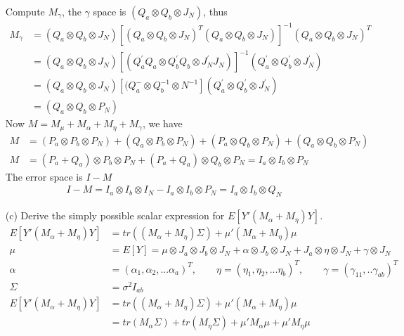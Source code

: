 \begin{itemize}
    Compute $M_\gamma$, the $\gamma$ space is $(Q_a \otimes Q_b \otimes J_N)$, thus
 \begin{align*}
    M_\gamma &= (Q_a \otimes Q_b \otimes J_N) [(Q_a \otimes Q_b \otimes J_N)^{T}(Q_a \otimes Q_b \otimes J_N)]^{-1} (Q_a \otimes Q_b \otimes J_N)^{T}\\
     &= (Q_a \otimes Q_b \otimes J_N) [(Q_a ^{'}Q_a\otimes Q_b^{'}Q_b \otimes J_N^{'}J_N)]^{-1}(Q_a^{'} \otimes Q_b^{'} \otimes J_N^{'})\\
     &= (Q_a \otimes Q_b \otimes J_N) [(Q_a^{-}\otimes Q_b^{-1} \otimes N^{-1}](Q_a^{'} \otimes Q_b^{'} \otimes J_N^{'})\\
     &= (Q_a \otimes Q_b \otimes P_N) 
 \end{align*}
    Now $M = M_{\mu} + M_{\alpha} + M_{\eta} + M_{\gamma}$, we have
 \begin{align*}
     M &=(P_a \otimes P_b \otimes P_N) + (Q_a \otimes P_b \otimes P_N) + (P_a \otimes Q_b \otimes P_N)  + (Q_a \otimes Q_b \otimes P_N) \\
     M &=(P_a + Q_a) \otimes P_b \otimes P_N + (P_a + Q_a) \otimes Q_b \otimes P_N  = I_a \otimes I_b \otimes P_N
 \end{align*}
    The error space is $I-M$
 \begin{align*}
     I-M = I_a \otimes I_b \otimes I_N - I_a \otimes I_b \otimes P_N = I_a \otimes I_b \otimes Q_N
 \end{align*}
 
    \item[(c)] Derive the simply possible scalar expression for $E[Y'(M_\alpha + M_\eta)Y]$.\\
 \begin{align*}
     E[Y'(M_\alpha + M_\eta)Y] &= tr((M_\alpha + M_\eta)\Sigma) + \mu'(M_\alpha + M_\eta)\mu \\
     \mu &= E[Y] = \mu \otimes J_a \otimes J_b \otimes J_N + \alpha \otimes J_b \otimes J_N + J_a \otimes \eta \otimes J_N + \gamma \otimes J_N \\
    \alpha &= (\alpha_1, \alpha_2,... \alpha_a)^T, \qquad \eta = (\eta_1, \eta_2,... \eta_b)^T, \qquad \gamma= (\gamma_{11},.. \gamma_{ab})^T\\
     \Sigma &= \sigma^2 I_{ab} \\
     E[Y'(M_\alpha + M_\eta)Y] &= tr((M_\alpha + M_\eta)\Sigma) + \mu'(M_\alpha + M_\eta)\mu \\
     &= tr(M_\alpha \Sigma) + tr(M_\eta\Sigma) + \mu'M_\alpha \mu + \mu' M_\eta \mu 
 \end{align*}
  

\end{itemize}
